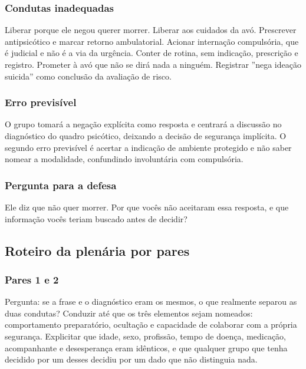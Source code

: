 \subsubsection*{Condutas inadequadas}

Liberar porque ele negou querer morrer. Liberar aos cuidados da avó. Prescrever antipsicótico e marcar retorno ambulatorial. Acionar internação compulsória, que é judicial e não é a via da urgência. Conter de rotina, sem indicação, prescrição e registro. Prometer à avó que não se dirá nada a ninguém. Registrar ''nega ideação suicida'' como conclusão da avaliação de risco.

\subsubsection*{Erro previsível}

O grupo tomará a negação explícita como resposta e centrará a discussão no diagnóstico do quadro psicótico, deixando a decisão de segurança implícita. O segundo erro previsível é acertar a indicação de ambiente protegido e não saber nomear a modalidade, confundindo involuntária com compulsória.

\subsubsection*{Pergunta para a defesa}

Ele diz que não quer morrer. Por que vocês não aceitaram essa resposta, e que informação vocês teriam buscado antes de decidir?

\filete

\subsection*{Roteiro da plenária por pares}

\subsubsection*{Pares 1 e 2}

Pergunta: se a frase e o diagnóstico eram os mesmos, o que realmente separou as duas condutas? Conduzir até que os três elementos sejam nomeados: comportamento preparatório, ocultação e capacidade de colaborar com a própria segurança. Explicitar que idade, sexo, profissão, tempo de doença, medicação, acompanhante e desesperança eram idênticos, e que qualquer grupo que tenha decidido por um desses decidiu por um dado que não distinguia nada.

